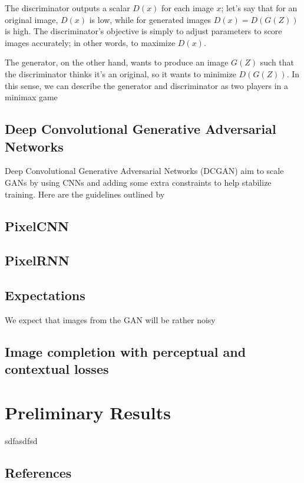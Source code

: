 \documentclass[10pt,twocolumn,letterpaper]{article}
\begin{document}
\par The discriminator outputs a scalar $D(x)$ for each image $x$; let's say that for an original image, $D(x)$ is low, while for generated images $D(x) = D(G(Z))$ is high. The discriminator's objective is simply to adjust parameters to score images accurately; in other words, to maximize $D(x)$.

The generator, on the other hand, wants to produce an image $G(Z)$ such that the discriminator thinks it's an original, so it wants to minimize $D(G(Z))$. In this sense, we can describe the generator and discriminator as two players in a minimax game \cite{GAN}



\subsection{Deep Convolutional Generative Adversarial Networks}
Deep Convolutional Generative Adversarial Networks (DCGAN) aim to scale GANs by using CNNs and adding some extra constraints to help stabilize training. Here are the guidelines outlined by 

\subsection{PixelCNN}
\subsection{PixelRNN}

\subsection{Expectations}
We expect that images from the GAN will be rather noisy

\subsection{Image completion with perceptual and contextual losses}

\section{Preliminary Results}
sdfasdfsd \cite{Alpher02}

\subsection{References}
\end{document}

